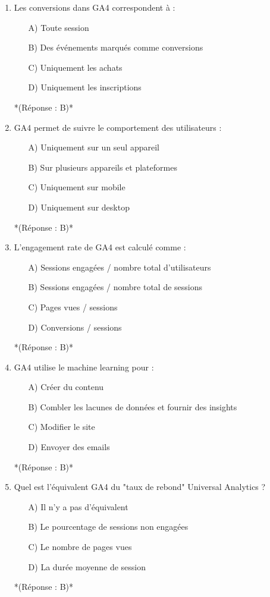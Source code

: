 \documentclass[12pt,a4paper,twoside]{report}
\begin{document}
\begin{enumerate}
    \item Les conversions dans GA4 correspondent à :
    \begin{itemize}
        \item[A)] Toute session
        \item[B)] Des événements marqués comme conversions
        \item[C)] Uniquement les achats
        \item[D)] Uniquement les inscriptions
    \end{itemize}
    *(Réponse : B)*

    \item GA4 permet de suivre le comportement des utilisateurs :
    \begin{itemize}
        \item[A)] Uniquement sur un seul appareil
        \item[B)] Sur plusieurs appareils et plateformes
        \item[C)] Uniquement sur mobile
        \item[D)] Uniquement sur desktop
    \end{itemize}
    *(Réponse : B)*

    \item L'engagement rate de GA4 est calculé comme :
    \begin{itemize}
        \item[A)] Sessions engagées / nombre total d'utilisateurs
        \item[B)] Sessions engagées / nombre total de sessions
        \item[C)] Pages vues / sessions
        \item[D)] Conversions / sessions
    \end{itemize}
    *(Réponse : B)*

    \item GA4 utilise le machine learning pour :
    \begin{itemize}
        \item[A)] Créer du contenu
        \item[B)] Combler les lacunes de données et fournir des insights
        \item[C)] Modifier le site
        \item[D)] Envoyer des emails
    \end{itemize}
    *(Réponse : B)*

    \item Quel est l'équivalent GA4 du "taux de rebond" Universal Analytics ?
    \begin{itemize}
        \item[A)] Il n'y a pas d'équivalent
        \item[B)] Le pourcentage de sessions non engagées
        \item[C)] Le nombre de pages vues
        \item[D)] La durée moyenne de session
    \end{itemize}
    *(Réponse : B)*


\end{enumerate}
\end{document}

